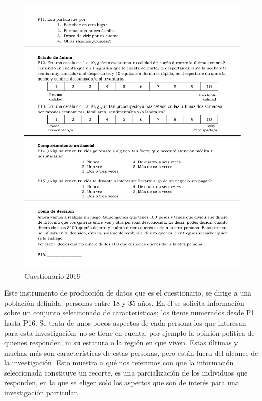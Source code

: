 \documentclass[]{book}
\begin{document}
\begin{figure}

{\centering \includegraphics[width=11.47in]{imagenes/cuestionario2019_02} 

}

\caption{Cuestionario 2019}\label{fig:cuestionario}
\end{figure}

Este instrumento de producción de datos que es el cuestionario, se dirige a una población definida: personas entre 18 y 35 años. En él se solicita información sobre un conjunto seleccionado de características; los ítems numerados desde P1 hasta P16. Se trata de unos pocos aspectos de cada persona los que interesan para esta investigación; no se tiene en cuenta, por ejemplo la opinión política de quienes responden, ni su estatura o la región en que viven. Estas últimas y muchas más son características de estas personas, pero están fuera del alcance de la investigación. Esto muestra a qué nos referimos con que la información seleccionada constituye un recorte, es una parcialización de los individuos que responden, en la que se eligen solo los aspectos que son de interés para una investigación particular.
\end{document}
